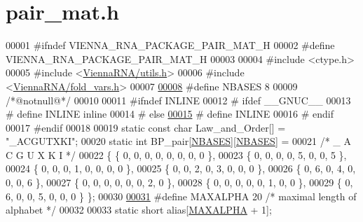 \hypertarget{pair__mat_8h_source}{}\section{pair\+\_\+mat.\+h}
\label{pair__mat_8h_source}

\begin{DoxyCode}
00001 \textcolor{preprocessor}{#ifndef VIENNA\_RNA\_PACKAGE\_PAIR\_MAT\_H}
00002 \textcolor{preprocessor}{#define VIENNA\_RNA\_PACKAGE\_PAIR\_MAT\_H}
00003 
00004 \textcolor{preprocessor}{#include <ctype.h>}
00005 \textcolor{preprocessor}{#include <\mbox{\hyperlink{utils_8h}{ViennaRNA/utils.h}}>}
00006 \textcolor{preprocessor}{#include <\mbox{\hyperlink{fold__vars_8h}{ViennaRNA/fold\_vars.h}}>}
00007 
\mbox{\hyperlink{pair__mat_8h_ad554b4852cd5fec35025db8edbbba3cd}{00008}} \textcolor{preprocessor}{#define NBASES 8}
00009 \textcolor{comment}{/*@notnull@*/}
00010 
00011 \textcolor{preprocessor}{#ifndef INLINE}
00012 \textcolor{preprocessor}{# ifdef \_\_GNUC\_\_}
00013 \textcolor{preprocessor}{#  define INLINE inline}
00014 \textcolor{preprocessor}{# else}
\mbox{\hyperlink{pair__mat_8h_a2eb6f9e0395b47b8d5e3eeae4fe0c116}{00015}} \textcolor{preprocessor}{#  define INLINE}
00016 \textcolor{preprocessor}{# endif}
00017 \textcolor{preprocessor}{#endif}
00018 
00019 \textcolor{keyword}{static} \textcolor{keyword}{const} \textcolor{keywordtype}{char} Law\_and\_Order[]         = \textcolor{stringliteral}{"\_ACGUTXKI"};
00020 \textcolor{keyword}{static} \textcolor{keywordtype}{int}        BP\_pair[\mbox{\hyperlink{pair__mat_8h_ad554b4852cd5fec35025db8edbbba3cd}{NBASES}}][\mbox{\hyperlink{pair__mat_8h_ad554b4852cd5fec35025db8edbbba3cd}{NBASES}}] =
00021   \textcolor{comment}{/* \_  A  C  G  U  X  K  I */}
00022 \{ \{ 0, 0, 0, 0, 0, 0, 0, 0 \},
00023   \{ 0, 0, 0, 0, 5, 0, 0, 5 \},
00024   \{ 0, 0, 0, 1, 0, 0, 0, 0 \},
00025   \{ 0, 0, 2, 0, 3, 0, 0, 0 \},
00026   \{ 0, 6, 0, 4, 0, 0, 0, 6 \},
00027   \{ 0, 0, 0, 0, 0, 0, 2, 0 \},
00028   \{ 0, 0, 0, 0, 0, 1, 0, 0 \},
00029   \{ 0, 6, 0, 0, 5, 0, 0, 0 \} \};
00030 
\mbox{\hyperlink{pair__mat_8h_a05a5ffe718aa431d97419a12fb082379}{00031}} \textcolor{preprocessor}{#define MAXALPHA 20       }\textcolor{comment}{/* maximal length of alphabet */}\textcolor{preprocessor}{}
00032 
00033 \textcolor{keyword}{static} \textcolor{keywordtype}{short}  alias[\mbox{\hyperlink{pair__mat_8h_a05a5ffe718aa431d97419a12fb082379}{MAXALPHA}} + 1];

\end{DoxyCode}
